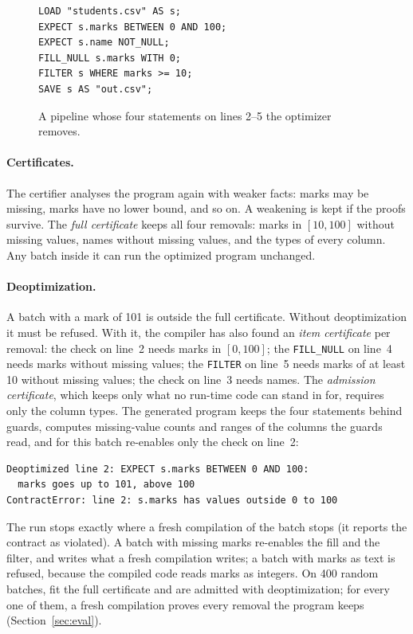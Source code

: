 \begin{figure}[t]
\begin{lstlisting}
LOAD "students.csv" AS s;
EXPECT s.marks BETWEEN 0 AND 100;
EXPECT s.name NOT_NULL;
FILL_NULL s.marks WITH 0;
FILTER s WHERE marks >= 10;
SAVE s AS "out.csv";
\end{lstlisting}
\caption{A pipeline whose four statements on lines 2--5 the optimizer removes.}
\label{fig:students}
\end{figure}

\paragraph{Certificates.} The certifier analyses the program again with weaker facts: marks may be
missing, marks have no lower bound, and so on. A weakening is kept if the proofs survive. The
\emph{full certificate} keeps all four removals: marks in $[10,100]$ without missing values, names
without missing values, and the types of every column. Any batch inside it can run the optimized
program unchanged.

\paragraph{Deoptimization.} A batch with a mark of 101 is outside the full certificate. Without
deoptimization it must be refused. With it, the compiler has also found an \emph{item certificate}
per removal: the check on line~2 needs marks in $[0,100]$; the \texttt{FILL\_NULL} on line~4 needs
marks without missing values; the \texttt{FILTER} on line~5 needs marks of at least 10 without
missing values; the check on line~3 needs names. The \emph{admission certificate}, which keeps only
what no run-time code can stand in for, requires only the column types. The generated program keeps
the four statements behind guards, computes missing-value counts and ranges of the columns the
guards read, and for this batch re-enables only the check on line~2:
\begin{lstlisting}[language={},numbers=none]
Deoptimized line 2: EXPECT s.marks BETWEEN 0 AND 100:
  marks goes up to 101, above 100
ContractError: line 2: s.marks has values outside 0 to 100
\end{lstlisting}
The run stops exactly where a fresh compilation of the batch stops (it reports the contract as
violated). A batch with missing marks re-enables the fill and the filter, and writes what a fresh
compilation writes; a batch with marks as text is refused, because the compiled code reads marks as
integers. On 400 random batches, \RandFull{} fit the full certificate and \RandDeopt{} are admitted with
deoptimization; for every one of them, a fresh compilation proves every removal the program keeps
(Section~\ref{sec:eval}).

